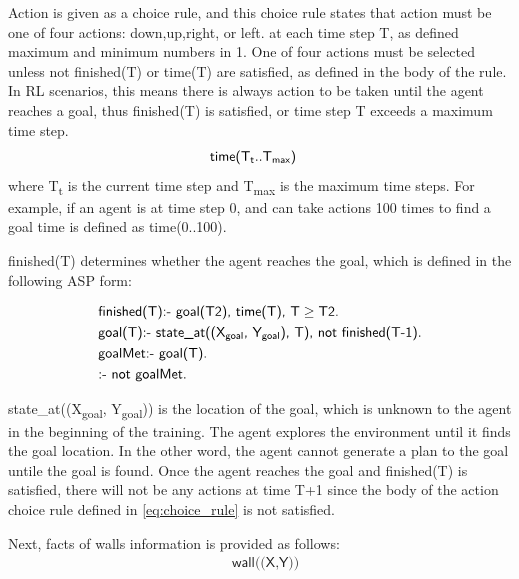 Action is given as a choice rule, and this choice rule states that action must be one of four actions: \textsf{down},\textsf{up},\textsf{right}, or \textsf{left}.
at each time step T, as defined maximum and minimum numbers in 1.
One of four actions must be selected unless \textsf{not finished(T)} or \textsf{time(T)} are satisfied, as defined in the body of the rule.
In RL scenarios, this means there is always action to be taken until the agent reaches a goal, thus \textsf{finished(T)} is satisfied, or time step T exceeds a maximum time step.
\begin{equation}
\begin{split}
&\textsf{time(T\textsubscript{t}..T\textsubscript{max})}
\end{split}
\end{equation}
where T\textsubscript{t} is the current time step and T\textsubscript{max} is the maximum time steps.
For example, if an agent is at time step 0, and can take actions 100 times to find a goal time is defined as \textsf{time(0..100)}.

\textsf{finished(T)} determines whether the agent reaches the goal, which is defined in the following ASP form:

\begin{equation}
\begin{split}
&\textsf{finished(T):- goal(T2), time(T), T} \geq \textsf{T2.}\\
&\textsf{goal(T):- state\_at((X\textsubscript{goal}, Y\textsubscript{goal}), T), not finished(T-1).}\\
&\textsf{goalMet:- goal(T).}\\
&\textsf{:- not goalMet.}
\end{split}
\end{equation}

\textsf{state\_at((X\textsubscript{goal}, Y\textsubscript{goal}))} is the location of the goal, which is unknown to the agent in the beginning of the training.
The agent explores the environment until it finds the goal location.
In the other word, the agent cannot generate a plan to the goal untile the goal is found. 
Once the agent reaches the goal and \textsf{finished(T)} is satisfied, 
there will not be any actions at time T+1 since the body of the action choice rule defined in \ref{eq:choice_rule} is not satisfied.

Next, facts of walls information is provided as follows:
\begin{equation}
\begin{split}
&\textsf{wall((X,Y))}\\
\end{split}
\end{equation}

